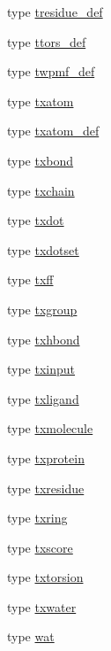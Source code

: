 \begin{DoxyCompactItemize}
\item 
type \hyperlink{structcalc__xscore_1_1tresidue__def}{tresidue\-\_\-def}
\item 
type \hyperlink{structcalc__xscore_1_1ttors__def}{ttors\-\_\-def}
\item 
type \hyperlink{structcalc__xscore_1_1twpmf__def}{twpmf\-\_\-def}
\item 
type \hyperlink{structcalc__xscore_1_1txatom}{txatom}
\item 
type \hyperlink{structcalc__xscore_1_1txatom__def}{txatom\-\_\-def}
\item 
type \hyperlink{structcalc__xscore_1_1txbond}{txbond}
\item 
type \hyperlink{structcalc__xscore_1_1txchain}{txchain}
\item 
type \hyperlink{structcalc__xscore_1_1txdot}{txdot}
\item 
type \hyperlink{structcalc__xscore_1_1txdotset}{txdotset}
\item 
type \hyperlink{structcalc__xscore_1_1txff}{txff}
\item 
type \hyperlink{structcalc__xscore_1_1txgroup}{txgroup}
\item 
type \hyperlink{structcalc__xscore_1_1txhbond}{txhbond}
\item 
type \hyperlink{structcalc__xscore_1_1txinput}{txinput}
\item 
type \hyperlink{structcalc__xscore_1_1txligand}{txligand}
\item 
type \hyperlink{structcalc__xscore_1_1txmolecule}{txmolecule}
\item 
type \hyperlink{structcalc__xscore_1_1txprotein}{txprotein}
\item 
type \hyperlink{structcalc__xscore_1_1txresidue}{txresidue}
\item 
type \hyperlink{structcalc__xscore_1_1txring}{txring}
\item 
type \hyperlink{structcalc__xscore_1_1txscore}{txscore}
\item 
type \hyperlink{structcalc__xscore_1_1txtorsion}{txtorsion}
\item 
type \hyperlink{structcalc__xscore_1_1txwater}{txwater}
\item 
type \hyperlink{structcalc__xscore_1_1wat}{wat}
\end{DoxyCompactItemize}
